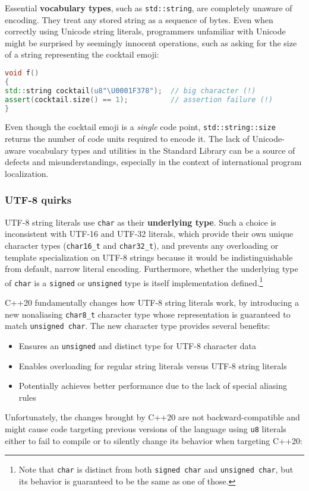 Essential \textbf{vocabulary types}, such as \texttt{std::string}, are
completely unaware of encoding. They treat any stored string as a
sequence of bytes. Even when correctly using Unicode string literals,
programmers unfamiliar with Unicode might be surprised by seemingly
innocent operations, such as asking for the size of a string
representing the cocktail emoji:

\begin{lstlisting}[language=C++]
void f()
{
std::string cocktail(u8"\U0001F378");  // big character (!)
assert(cocktail.size() == 1);          // assertion failure (!)
}
\end{lstlisting}

\noindent Even though the cocktail emoji is a \emph{single} code point,
\texttt{std::string::size} returns the number of code units required to
encode it. The lack of Unicode-aware vocabulary types and utilities in
the Standard Library can be a source of defects and misunderstandings,
especially in the context of international program localization.

\subsubsection[UTF-8 quirks]{UTF-8 quirks}\label{utf-8-quirks}

UTF-8 string literals use \texttt{char} as their \textbf{underlying type}. Such a
choice is inconsistent with UTF-16 and UTF-32 literals, which provide
their own unique character types (\texttt{char16\_t} and
\texttt{char32\_t}), and prevents any overloading or template
specialization on UTF-8 strings because it would be indistinguishable from
default, narrow literal encoding. Furthermore, whether the underlying
type of \texttt{char} is a \texttt{signed} or \texttt{unsigned} type is
itself implementation defined.{\cprotect\footnote{Note that
\texttt{char} is distinct from both \texttt{signed}~\texttt{char} and
\texttt{unsigned}~\texttt{char}, but its behavior is guaranteed to be
the same as one of those.}}

C++20
fundamentally changes how UTF-8 string literals work, by introducing a
new nonaliasing \texttt{char8\_t} character type whose representation
is guaranteed to match \texttt{unsigned}~\texttt{char}. The new
character type provides several benefits:
\begin{itemize}
\item{Ensures an \texttt{unsigned} and distinct type for UTF-8 character data}
\item{Enables overloading for regular string literals versus UTF-8 string literals}
\item{Potentially achieves better performance due to the lack of special aliasing rules}
\end{itemize}
Unfortunately, the changes brought by C++20 are not
backward-compatible and might cause code targeting previous versions
of the language using \texttt{u8} literals either to fail to compile
or to silently change its behavior when targeting C++20:

